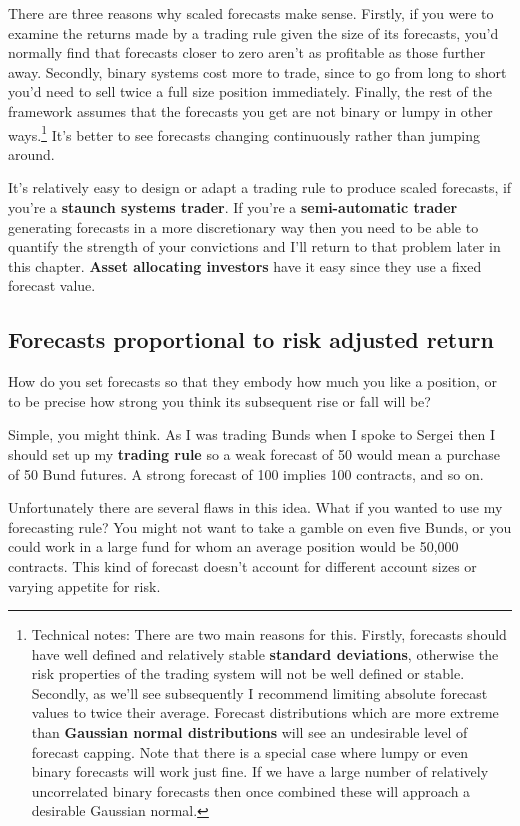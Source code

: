 There are three reasons why scaled forecasts make sense. Firstly, if you were to examine the returns made by a trading rule given the size of its forecasts, you'd normally find that forecasts closer to zero aren't as profitable as those further away. Secondly, binary systems cost more to trade, since to go from long to short you'd need to sell twice a full size position immediately. Finally, the rest of the framework assumes that the forecasts you get are not binary or lumpy in other ways.\footnote{Technical notes: There are two main reasons for this. Firstly, forecasts should have well defined and relatively stable \textbf{standard deviations}, otherwise the risk properties of the trading system will not be well defined or stable. Secondly, as we'll see subsequently I recommend limiting absolute forecast values to twice their average. Forecast distributions which are more extreme than \textbf{Gaussian normal distributions} will see an undesirable level of forecast capping. Note that there is a special case where lumpy or even binary forecasts will work just fine. If we have a large number of relatively uncorrelated binary forecasts then once combined these will approach a desirable Gaussian normal.} It's better to see forecasts changing continuously rather than jumping around.

It's relatively easy to design or adapt a trading rule to produce scaled forecasts, if you're a \textbf{staunch systems trader}. If you're a \textbf{semi-automatic trader} generating forecasts in a more discretionary way then you need to be able to quantify the strength of your convictions and I'll return to that problem later in this chapter. \textbf{Asset allocating investors} have it easy since they use a fixed forecast value.

\subsection*{Forecasts proportional to risk adjusted return}

How do you set forecasts so that they embody how much you like a position, or to be precise how strong you think its subsequent rise or fall will be?

Simple, you might think. As I was trading Bunds when I spoke to Sergei then I should set up my \textbf{trading rule} so a weak forecast of 50 would mean a purchase of 50 Bund futures. A strong forecast of 100 implies 100 contracts, and so on.

Unfortunately there are several flaws in this idea. What if you wanted to use my forecasting rule? You might not want to take a gamble on even five Bunds, or you could work in a large fund for whom an average position would be 50,000 contracts. This kind of forecast doesn't account for different account sizes or varying appetite for risk.

